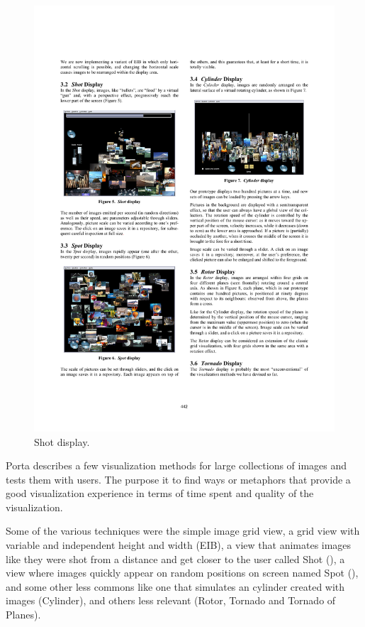 \begin{figure}[ht]
\begin{minipage}[b]{0.5\textwidth}
		\includegraphics[width=\textwidth]{imgs-RelatedWork/Porta-shot}
		\caption{Shot display.}
		\label{fig:porta-shot}
	\end{minipage}
\end{figure}

Porta \cite{Porta:2006p416} describes a few visualization methods for large collections of images and tests them with users. The purpose it to find ways or metaphors that provide a good visualization experience in terms of time spent and quality of the visualization.

Some of the various techniques were the simple image grid view, a grid view with variable and independent height and width (EIB), a view that animates images like they were shot from a distance and get closer to the user called Shot (), a view where images quickly appear on random positions on screen named Spot (), and some other less commons like one that simulates an cylinder created with images (Cylinder), and others less relevant (Rotor, Tornado and Tornado of Planes).

